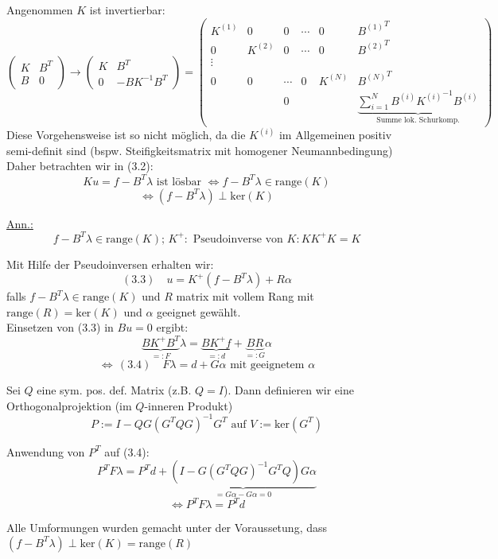 Angenommen $K$ ist invertierbar:
\[
  \begin{pmatrix}
    K & B^T \\
    B & 0 
  \end{pmatrix} 
  \rightarrow 
  \begin{pmatrix} 
    K & B^T \\
    0 & -BK^{-1}B^T 
  \end{pmatrix} 
  = 
  \begin{pmatrix}   
    K^{(1)} & 0 & 0 & \cdots & 0 & {B^{(1)}}^T \\
    0 & K^{(2)}   & 0 & \cdots  &0 & {B^{(2)}}^T\\
    \vdots\\
    0 & 0 & \cdots & 0 & K^{(N)} & {B^{(N)}}^T \\
    &     &      0    &   &            &  \underbrace{\sum_{i=1}^N B^{(i)}{K^{(i)}}^{-1} B^{(i)}}_{\text{Summe lok. Schurkomp.}}
  \end{pmatrix}
\]
Diese Vorgehensweise ist so nicht möglich, da die $K^{(i)}$ im Allgemeinen positiv semi-definit sind (bspw. Steifigkeitsmatrix mit homogener Neumannbedingung)\\
Daher betrachten wir in (3.2):
\[ Ku=f-B^T\lambda \text{ ist lösbar } \Leftrightarrow f-B^T\lambda \in \text{range}(K) \]
\[ \Leftrightarrow (f-B^T\lambda) \perp \text{ker}(K) \]

\underline{Ann.:}
\[ f-B^T\lambda \in \text{range}(K);\, K^+ : \text{ Pseudoinverse von } K: KK^+K=K \]

Mit Hilfe der Pseudoinversen erhalten wir:
\[(3.3)\quad  u=K^+(f-B^T\lambda)+R\alpha  \]
falls $f-B^T\lambda \in \text{range}(K)$ und $R$ matrix mit vollem Rang mit $\text{range}(R)= \text{ker}(K)$ und $\alpha$ geeignet gewählt.\\

Einsetzen von (3.3) in $Bu=0$ ergibt:
\[ \underbrace{BK^+ B^T}_{=:F} \lambda = \underbrace{BK^+ f}_{=:d} + \underbrace{BR}_{=:G}\alpha \]
\[ \Leftrightarrow \, (3.4) \quad \boxed{ F\lambda= d + G\alpha } \text{ mit geeignetem } \alpha \]

Sei $Q$ eine sym. pos. def. Matrix (z.B. $Q=I$). Dann definieren wir eine Orthogonalprojektion (im $Q$-inneren Produkt)
\[ P:=I-QG(G^TQG)^{-1}G^T \text{ auf } V:= \text{ker}(G^T) \]

Anwendung von $P^T$  auf (3.4):
\[ P^TF\lambda = P^Td + \underbrace{(I-G(G^TQG)^{-1}G^TQ)G\alpha}_{=G\alpha - G\alpha=0} \]
\[ \Leftrightarrow \boxed{P^TF\lambda = P^T d } \]

Alle Umformungen wurden gemacht unter der Voraussetung, dass $ (f-B^T\lambda)\perp \text{ker}(K)=\text{range}(R)$ \\

